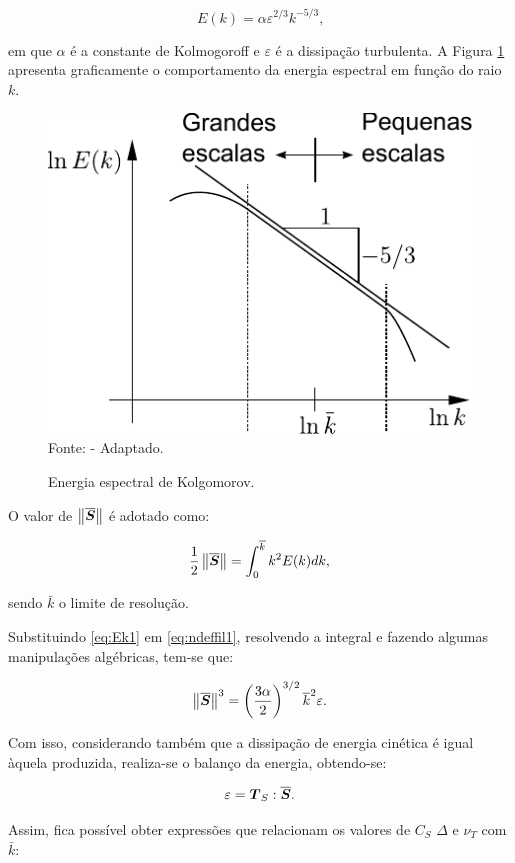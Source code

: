\begin{equation}
    E(k)=\alpha\varepsilon^{2/3}k^{-5/3}\text{,}\label{eq:Ek1}
\end{equation}

\noindent em que $\alpha$ é a constante de Kolmogoroff e $\varepsilon$ é a dissipação turbulenta. A Figura \ref{fig:EnergiaEspectral} apresenta graficamente o comportamento da energia espectral em função do raio $k$.

\begin{figure}[h!]
    \centering
    \caption{Energia espectral de Kolgomorov.}
    \includegraphics[width=0.4\linewidth]{Figuras/EnergiaEspectral.pdf}
    \\Fonte: \cite{hughes2000large} - Adaptado.
    \label{fig:EnergiaEspectral}
\end{figure}

O valor de $\left\lVert{\overline{\boldsymbol{S}}}\right\lVert$ é adotado como:

\begin{equation}
    \frac{1}{2}\left\lVert{\overline{\boldsymbol{S}}}\right\lVert=\int_0^{\overline{k}}{k^2E(k)dk}\text{,}\label{eq:ndeffil1}
\end{equation}

\noindent sendo $\bar{k}$ o limite de resolução.

Substituindo \eqref{eq:Ek1} em \eqref{eq:ndeffil1}, resolvendo a integral e fazendo algumas manipulações algébricas, tem-se que:

\begin{equation}
    \left\lVert{\overline{\boldsymbol{S}}}\right\lVert^3=\left({\frac{3\alpha}{2}}\right)^{3/2}\overline{k}^2\varepsilon\text{.}
\end{equation}

Com isso, considerando também que a dissipação de energia cinética é igual àquela produzida, realiza-se o balanço da energia, obtendo-se:

\begin{equation}
    \varepsilon=\boldsymbol{T}_S:\overline{\boldsymbol{S}}\text{.}
\end{equation}

\noindent Assim, fica possível obter expressões que relacionam os valores de $C_S$ $\Delta$ e $\nu_T$ com $\bar{k}$:

